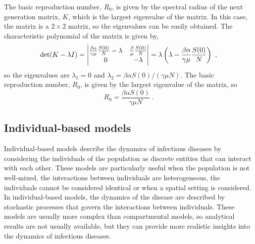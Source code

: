 The basic reproduction number, $R_0$, is given by the spectral radius of the
next generation matrix, $K$, which is the largest eigenvalue of the matrix.
In
this case, the matrix is a $2\times2$ matrix, so the eigenvalues can be
easily
obtained. The characteristic polynomial of the matrix is given by,
\begin{equation}
  \det(K-\lambda I)=\begin{vmatrix}
    \frac{\beta\alpha}{\gamma\mu}\frac{S(0)}{N}-\lambda &
    \frac{\beta}{\mu}\frac{S(0)}{N}                                \\
    0                                                   & -\lambda

  \end{vmatrix}=\lambda\left(\lambda-\frac{\beta\alpha}{\gamma\mu}
    \frac{S(0)}{N}\right)
  \ ,
\end{equation}
so the eigenvalues are $\lambda_1=0$ and $\lambda_2=\beta\alpha
  S(0)/(\gamma\mu
  N)$. The basic reproduction number, $R_0$, is given by the largest eigenvalue
of the matrix, so
\begin{equation}
  R_0=\frac{\beta\alpha S(0)}{\gamma\mu N} \ .
\end{equation}

\subsection{\label{sec:Individual-based models} Individual-based models}

Individual-based models describe the dynamics of infectious diseases by
considering the individuals of the population as discrete entities that can
interact with each other. These models are particularly useful when the
population is not well-mixed, the interactions between individuals are
heterogeneous, the individuals cannot be considered identical or when a
spatial setting is considered. In individual-based models, the dynamics of
the disease are described by stochastic processes that govern the interactions
between individuals. These models are usually more complex than compartmental
models, so analytical results are not usually available, but they can
provide more realistic insights into the dynamics of infectious diseases.

